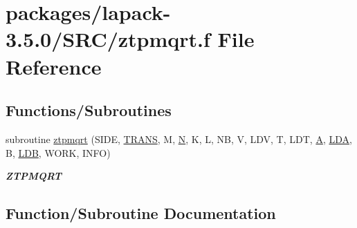 \hypertarget{ztpmqrt_8f}{}\section{packages/lapack-\/3.5.0/\+S\+R\+C/ztpmqrt.f File Reference}
\label{ztpmqrt_8f}
\subsection*{Functions/\+Subroutines}
\begin{DoxyCompactItemize}
\item 
subroutine \hyperlink{ztpmqrt_8f_a0b0f91e20dd8691445f221901bfc91c4}{ztpmqrt} (S\+I\+D\+E, \hyperlink{superlu__enum__consts_8h_a0c4e17b2d5cea33f9991ccc6a6678d62a1f61e3015bfe0f0c2c3fda4c5a0cdf58}{T\+R\+A\+N\+S}, M, \hyperlink{polmisc_8c_a0240ac851181b84ac374872dc5434ee4}{N}, K, L, N\+B, V, L\+D\+V, T, L\+D\+T, \hyperlink{classA}{A}, \hyperlink{example__user_8c_ae946da542ce0db94dced19b2ecefd1aa}{L\+D\+A}, B, \hyperlink{example__user_8c_a50e90a7104df172b5a89a06c47fcca04}{L\+D\+B}, W\+O\+R\+K, I\+N\+F\+O)
\begin{DoxyCompactList}\small\item\em {\bfseries Z\+T\+P\+M\+Q\+R\+T} \end{DoxyCompactList}\end{DoxyCompactItemize}


\subsection{Function/\+Subroutine Documentation}
\hypertarget{ztpmqrt_8f_a0b0f91e20dd8691445f221901bfc91c4}{}

